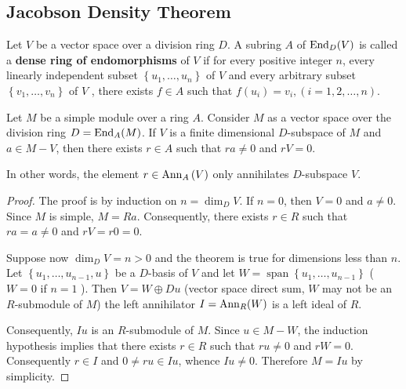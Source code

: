 \subsection{Jacobson Density Theorem} %
\begin{definition}
    Let $V$ be a vector space over a division ring $D$.
    A subring $A$ of $\operatorname{\operatorname{End}}_D(V)$ is called a \textbf{dense ring of endomorphisms} of $V$ if for every positive integer $n$, every linearly independent subset $\left\{u_1, \ldots, u_{n}\right\}$ of $V$ and every arbitrary subset $\left\{v_1, \ldots, v_{n}\right\}$ of $V$ , there exists $f \in A$ such that $f\left(u_{i}\right)=v_{i}, (i=1,2, \ldots, n)$.
\end{definition}




\begin{lemma}
    \label{lem: Lemma of Jacobson Density Theorem}
    Let $M$ be a simple module over a ring $A$.
    Consider $M$ as a vector space over the division ring $D=\operatorname{\operatorname{End}}_A(M)$.
    If $V$ is a finite dimensional $D$-subspace of $M$ and $a \in M-V$, then there exists $r \in A$ such that $ra \neq 0$ and $rV=0$.
    \begin{remark}
        In other words, the element $r\in \operatorname{\operatorname{Ann}}_A\left( V \right)$ only annihilates $D$-subspace $V$.
    \end{remark}
    \begin{proof}
        The proof is by induction on $n=\operatorname{dim}_D V$. If $n=0$, then $V=0$ and $a \neq 0$. Since $M$ is simple, $M=R a$. Consequently, there exists $r \in R$ such that $r a=a \neq 0$ and $r V=r 0=0$.

        Suppose now $\operatorname{dim}_D V=n>0$ and the theorem is true for dimensions less than $n$.
        Let $\left\{u_1, \ldots, u_{n-1}, u\right\}$ be a $D$-basis of $V$ and let $W=\operatorname{span}\left\{u_1, \ldots, u_{n-1}\right\}$ ( $W=0$ if $n=1$ ).
        Then $V=W \oplus D u$ (vector space direct sum, $W$ may not be an $R$-submodule of $M$) the left annihilator $I=\operatorname{\operatorname{Ann}}_R(W)$ is a left ideal of $R$.

        Consequently, $I u$ is an $R$-submodule of $M$. Since $u \in M-W$, the induction hypothesis implies that there exists $r \in R$ such that $r u \neq 0$ and $r W=0$. Consequently $r\in I$ and $0 \neq r u \in I u$, whence $I u \neq 0$.
        Therefore $M=I u$ by simplicity.


\end{proof}
\end{lemma}
